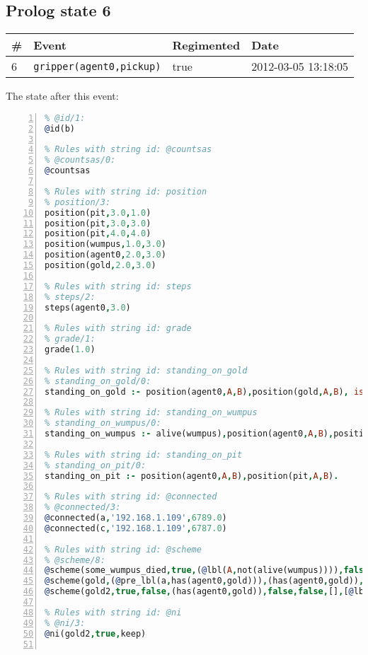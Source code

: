 \documentclass[11pt]{article}\usepackage[utf8]{inputenc}\usepackage{geometry}
\begin{document}
\subsection{Prolog state 6}
\begin{table}[ht]
\centering 
\begin{tabular}{l l l l} 
\textbf{\#} & \textbf{Event} & \textbf{Regimented} & \textbf{Date} \\ [0.5ex] 
\hline
6&\texttt{gripper(agent0,pickup)}&true&2012-03-05 13:18:05\\ [1ex] \hline\end{tabular}
\end{table}
The state after this event:

\lstset{breaklines=true}\begin{lstlisting}[language=Prolog, numbers=left]
% Rules with string id: @id
% @id/1:
@id(b)

% Rules with string id: @countsas
% @countsas/0:
@countsas

% Rules with string id: position
% position/3:
position(pit,3.0,1.0)
position(pit,3.0,3.0)
position(pit,4.0,4.0)
position(wumpus,1.0,3.0)
position(agent0,2.0,3.0)
position(gold,2.0,3.0)

% Rules with string id: steps
% steps/2:
steps(agent0,3.0)

% Rules with string id: grade
% grade/1:
grade(1.0)

% Rules with string id: standing_on_gold
% standing_on_gold/0:
standing_on_gold :- position(agent0,A,B),position(gold,A,B), is (C,+(A,B)),>(C,2.0).

% Rules with string id: standing_on_wumpus
% standing_on_wumpus/0:
standing_on_wumpus :- alive(wumpus),position(agent0,A,B),position(wumpus,A,B).

% Rules with string id: standing_on_pit
% standing_on_pit/0:
standing_on_pit :- position(agent0,A,B),position(pit,A,B).

% Rules with string id: @connected
% @connected/3:
@connected(a,'192.168.1.109',6789.0)
@connected(c,'192.168.1.109',6787.0)

% Rules with string id: @scheme
% @scheme/8:
@scheme(some_wumpus_died,true,(@lbl(A,not(alive(wumpus)))),false,false,false,[update(bombard_wumpus)|[]],[])
@scheme(gold,(@pre_lbl(a,has(agent0,gold))),(has(agent0,gold)),false,(@lbl(a,not(has(agent0,gold)))),false,[update(force_drop)|[]],[])
@scheme(gold2,true,false,(has(agent0,gold)),false,false,[],[@lbl(c,update(bombard_wumpus))|[]])

% Rules with string id: @ni
% @ni/3:
@ni(gold2,true,keep)


\end{lstlisting}
\end{document}
